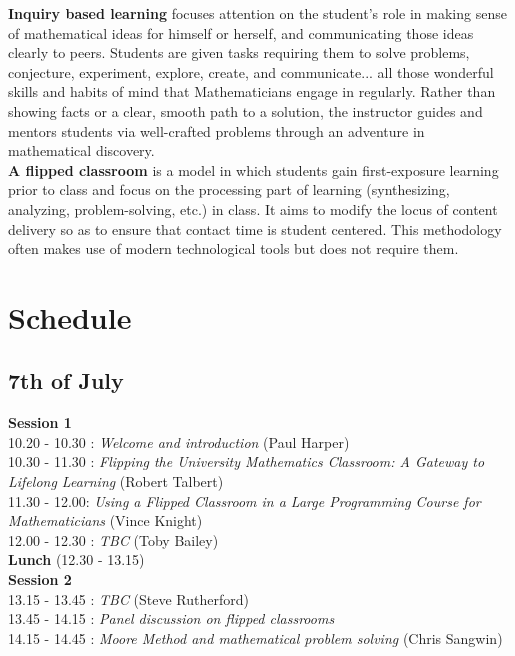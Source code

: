 \documentclass[a4paper]{leaflet}
\begin{document}
\vspace{1cm}

\textbf{Inquiry based learning} focuses attention on the student's role in making sense of mathematical ideas for himself or herself, and communicating those ideas clearly to peers. Students are given tasks requiring them to solve problems, conjecture, experiment, explore, create, and communicate... all those wonderful skills and habits of mind that Mathematicians engage in regularly. Rather than showing facts or a clear, smooth path to a solution, the instructor guides and mentors students via well-crafted problems through an adventure in mathematical discovery.\\

\vspace{1cm}
\textbf{A flipped classroom} is a model in which students gain first-exposure learning prior to class and focus on the processing part of learning (synthesizing, analyzing, problem-solving, etc.) in class. It aims to modify the locus of content delivery so as to ensure that contact time is student centered. This methodology often makes use of modern technological tools but does not require them.

\newpage
\section{Schedule}
\subsection{7th of July}
\vspace{1cm}

\textbf{Session 1}\\

10.20 - 10.30 : \textit{Welcome and introduction} (Paul Harper)\\
10.30 - 11.30 : \textit{Flipping the University Mathematics Classroom: A Gateway to Lifelong Learning} (Robert Talbert)\\
11.30 - 12.00: \textit{Using a Flipped Classroom in a Large Programming Course for Mathematicians} (Vince Knight)\\
12.00 - 12.30 : \textit{TBC} (Toby Bailey)\\

\textbf{Lunch} (12.30 - 13.15)\\

\textbf{Session 2}\\

13.15 - 13.45 : \textit{TBC} (Steve Rutherford)\\
13.45 - 14.15 : \textit{Panel discussion on flipped classrooms}\\
14.15 - 14.45 : \textit{Moore Method and mathematical problem solving} (Chris Sangwin)\\
\end{document}
